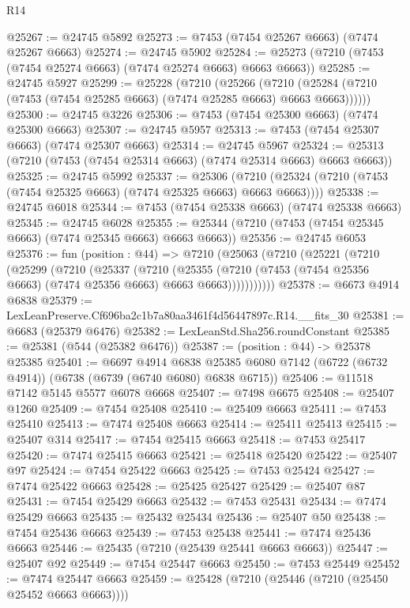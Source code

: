 \begin{lexlean}{R14}
\begin{coremodule}
@25267 := @24745 @5892
@25273 := @7453 (@7454 @25267 @6663) (@7474 @25267 @6663)
@25274 := @24745 @5902
@25284 := @25273 (@7210 (@7453 (@7454 @25274 @6663) (@7474 @25274 @6663) @6663 @6663))
@25285 := @24745 @5927
@25299 := @25228
    (@7210
      (@25266
        (@7210 (@25284 (@7210 (@7453 (@7454 @25285 @6663) (@7474 @25285 @6663) @6663 @6663))))))
@25300 := @24745 @3226
@25306 := @7453 (@7454 @25300 @6663) (@7474 @25300 @6663)
@25307 := @24745 @5957
@25313 := @7453 (@7454 @25307 @6663) (@7474 @25307 @6663)
@25314 := @24745 @5967
@25324 := @25313 (@7210 (@7453 (@7454 @25314 @6663) (@7474 @25314 @6663) @6663 @6663))
@25325 := @24745 @5992
@25337 := @25306
    (@7210 (@25324 (@7210 (@7453 (@7454 @25325 @6663) (@7474 @25325 @6663) @6663 @6663))))
@25338 := @24745 @6018
@25344 := @7453 (@7454 @25338 @6663) (@7474 @25338 @6663)
@25345 := @24745 @6028
@25355 := @25344 (@7210 (@7453 (@7454 @25345 @6663) (@7474 @25345 @6663) @6663 @6663))
@25356 := @24745 @6053
@25376 := fun (position : @44) =>
  @7210
    (@25063
      (@7210
        (@25221
          (@7210
            (@25299
              (@7210
                (@25337
                  (@7210
                    (@25355
                      (@7210 (@7453 (@7454 @25356 @6663) (@7474 @25356 @6663) @6663 @6663)))))))))))
@25378 := @6673 @4914 @6838
@25379 := LexLeanPreserve.Cf696ba2c1b7a80aa3461f4d56447897c.R14.__fits_30
@25381 := @6683 (@25379 @6476)
@25382 := LexLeanStd.Sha256.roundConstant
@25385 := @25381 (@544 (@25382 @6476))
@25387 := (position : @44) -> @25378 @25385
@25401 := @6697
    @4914
    @6838
    @25385
    @6080
    @7142
    (@6722 (@6732 @4914))
    (@6738 (@6739 (@6740 @6080) @6838 @6715))
@25406 := @11518 @7142 @5145 @5577 @6078 @6668
@25407 := @7498 @6675
@25408 := @25407 @1260
@25409 := @7454 @25408
@25410 := @25409 @6663
@25411 := @7453 @25410
@25413 := @7474 @25408 @6663
@25414 := @25411 @25413
@25415 := @25407 @314
@25417 := @7454 @25415 @6663
@25418 := @7453 @25417
@25420 := @7474 @25415 @6663
@25421 := @25418 @25420
@25422 := @25407 @97
@25424 := @7454 @25422 @6663
@25425 := @7453 @25424
@25427 := @7474 @25422 @6663
@25428 := @25425 @25427
@25429 := @25407 @87
@25431 := @7454 @25429 @6663
@25432 := @7453 @25431
@25434 := @7474 @25429 @6663
@25435 := @25432 @25434
@25436 := @25407 @50
@25438 := @7454 @25436 @6663
@25439 := @7453 @25438
@25441 := @7474 @25436 @6663
@25446 := @25435 (@7210 (@25439 @25441 @6663 @6663))
@25447 := @25407 @92
@25449 := @7454 @25447 @6663
@25450 := @7453 @25449
@25452 := @7474 @25447 @6663
@25459 := @25428 (@7210 (@25446 (@7210 (@25450 @25452 @6663 @6663))))

\end{coremodule}
\end{lexlean}
